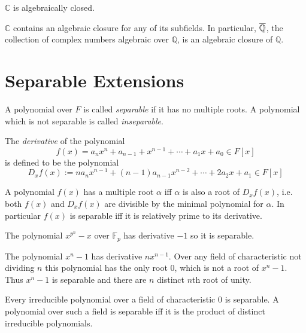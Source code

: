 \documentclass[a4paper]{article}
\begin{document}
\begin{theorem}
  $\mathbb{C}$ is algebraically closed.
\end{theorem}

\begin{corollary}
  $\mathbb{C}$ contains an algebraic closure for any of its subfields. In particular, $\cl{\mathbb{Q}}$, the collection of complex numbers algebraic over $\mathbb{Q}$, is an algebraic closure of $\mathbb{Q}$.
\end{corollary}

\section{Separable Extensions}

\begin{definition}
  A polynomial over $F$ is called \emph{separable} if it has no multiple roots. A polynomial which is not separable is called \emph{inseparable}.
\end{definition}

\begin{definition}
  The \emph{derivative} of the polynomial
  \[ f(x)=a_n x^n+a_{n-1}+x^{n-1}+\cdots + a_1 x + a_0 \in F[x] \]
  is defined to be the polynomial
  \[ D_x f(x) := n a_n x^{n-1} + (n-1) a_{n-1} x^{n-2}+\cdots + 2a_2 x + a_1 \in F[x] \]
\end{definition}

\begin{proposition}
  A polynomial $f(x)$ has a multiple root $\alpha$ iff $\alpha$ is also a root of $D_xf(x)$, i.e. both $f(x)$ and $D_xf(x)$ are divisible by the minimal polynomial for $\alpha$. In particular $f(x)$ is separable iff it is relatively prime to its derivative.
\end{proposition}

\begin{eg}
  The polynomial $x^{p^n}-x$ over $\mathbb{F}_p$ has derivative $-1$ so it is separable.
\end{eg}

\begin{eg}
  The polynomial $x^n-1$ has derivative $nx^{n-1}$. Over any field of characteristic not dividing $n$ this polynomial has the only root $0$, which is not a root of $x^n-1$. Thus $x^n-1$ is separable and there are $n$ distinct $n$th root of unity.
\end{eg}

\begin{corollary}
  Every irreducible polynomial over a field of characteristic $0$ is separable. A polynomial over such a field is separable iff it is the product of distinct irreducible polynomials.
\end{corollary}
\end{document}
